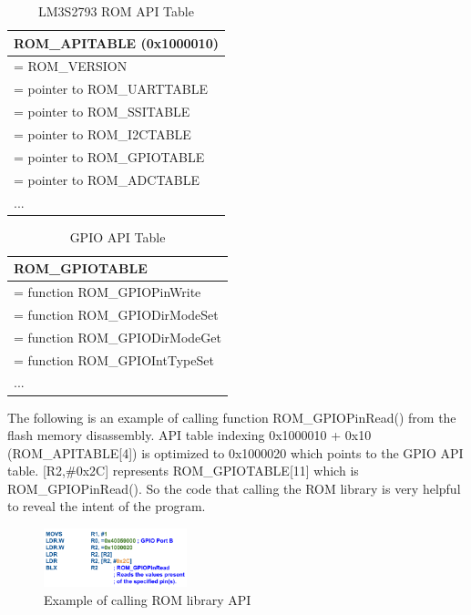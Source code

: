 \begin{center}
	\begin{table}
		\begin{tabular}{|p{7.2cm}|} 
			\hline
			ROM\_APITABLE (0x1000010) \\ [0.5ex] 
			\hline
			[0] = ROM\_VERSION \\
			\hline
			[1] = pointer to ROM\_UARTTABLE \\
			\hline
			[2] = pointer to ROM\_SSITABLE \\
			\hline
			[3] = pointer to ROM\_I2CTABLE \\
			\hline
			[4] = pointer to ROM\_GPIOTABLE \\
			\hline
			[5] = pointer to ROM\_ADCTABLE \\
			\hline
			... \\ 
			\hline
		\end{tabular}
		\caption{LM3S2793 ROM API Table}
		\label{tab:romtable}
	\end{table}
\end{center}

\begin{center}
	\begin{table}
		\begin{tabular}{|p{7.2cm}|} 
			\hline
			ROM\_GPIOTABLE \\ [0.5ex] 
			\hline
			[0] = function ROM\_GPIOPinWrite \\
			\hline
			[1] = function ROM\_GPIODirModeSet \\
			\hline
			[2] = function ROM\_GPIODirModeGet \\
			\hline
			[3] = function ROM\_GPIOIntTypeSet \\
			\hline
			... \\ 
			\hline
		\end{tabular}
		\caption{GPIO API Table}
		\label{tab:gpiotable}
	\end{table}
\end{center}


The following is an example of calling function ROM\_GPIOPinRead() from the flash memory disassembly. API table indexing 0x1000010 + 0x10 (ROM\_APITABLE[4]) is optimized to 0x1000020 which points to the GPIO API table. [R2,\#0x2C] represents ROM\_GPIOTABLE[11] which is ROM\_GPIOPinRead(). So the code that calling the ROM library is very helpful to reveal the intent of the program.


\begin{figure}[th]
	\includegraphics[width=0.37\textwidth]{figures/romapiexample}
	\centering
	\caption{Example of calling ROM library API}
	\label{fig:romapiexample}
\end{figure}



